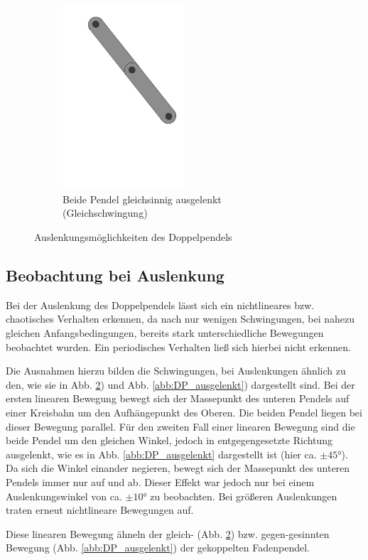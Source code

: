 \documentclass[11pt,a4paper,titlepage, ngerman]{article}
\newcommand{\refabb}[1]{Abb. \ref{abb:#1}}
\begin{document}
\begin{figure}[ht]
\begin{subfigure}{0.5\textwidth}
				\end{subfigure}		
				\begin{subfigure}{0.5\textwidth}
					\centering
					\includegraphics[width=0.5\textwidth]{Doppelpendel_stabil.png}
					\caption{Beide Pendel gleichsinnig ausgelenkt (Gleichschwingung)}
					\label{abb:DP_stabil}	
				\end{subfigure}
				\caption{Auslenkungsmöglichkeiten des Doppelpendels}
			\end{figure}
		
		\subsection{Beobachtung bei Auslenkung}
		
			Bei der Auslenkung des Doppelpendels lässt sich ein nichtlineares bzw. chaotisches Verhalten erkennen, da nach nur wenigen Schwingungen, bei nahezu gleichen Anfangsbedingungen, bereits stark unterschiedliche Bewegungen beobachtet wurden. Ein periodisches Verhalten ließ sich hierbei nicht erkennen.
		
			Die Ausnahmen hierzu bilden die Schwingungen, bei Auslenkungen ähnlich zu den, wie sie in \refabb{DP_stabil}) und \refabb{DP_ausgelenkt}) dargestellt sind. Bei der ersten linearen Bewegung bewegt sich der Massepunkt des unteren Pendels auf einer Kreisbahn um den Aufhängepunkt des Oberen. Die beiden Pendel liegen bei dieser Bewegung parallel. Für den zweiten Fall einer linearen Bewegung sind die beide Pendel um den gleichen Winkel, jedoch in entgegengesetzte Richtung ausgelenkt, wie es in \refabb{DP_ausgelenkt} dargestellt ist (hier ca. $\pm \ang{45}$). Da sich die Winkel einander negieren, bewegt sich der Massepunkt des unteren Pendels immer nur auf und ab. Dieser Effekt war jedoch nur bei einem Auslenkungswinkel von ca. $\pm \ang{10}$ zu beobachten. Bei größeren Auslenkungen traten erneut nichtlineare Bewegungen auf.
			
			Diese linearen Bewegung ähneln der gleich- (\refabb{DP_stabil}) bzw. gegen-gesinnten Bewegung (\refabb{DP_ausgelenkt}) der gekoppelten Fadenpendel.  
\end{document}
